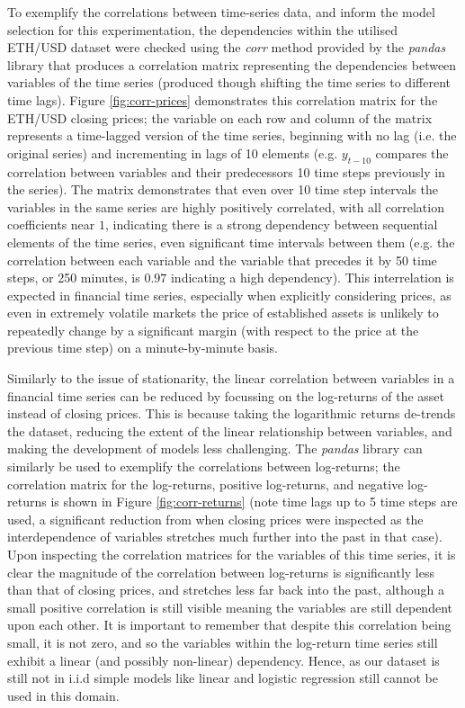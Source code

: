 \documentclass[a4paper, 11pt]{article}
\begin{document}
    To exemplify the correlations between time-series data, and inform the model selection for this experimentation, the dependencies within the utilised ETH/USD dataset were checked using the \emph{corr} method provided by the \emph{pandas} library \cite{pandas} that produces a correlation matrix representing the dependencies between variables of the time series (produced though shifting the time series to different time lags). Figure \ref{fig:corr-prices} demonstrates this correlation matrix for the ETH/USD closing prices; the variable on each row and column of the matrix represents a time-lagged version of the time series, beginning with no lag (i.e. the original series) and incrementing in lags of 10 elements (e.g. $y_{t-10}$ compares the correlation between variables and their predecessors 10 time steps previously in the series). The matrix demonstrates that even over 10 time step intervals the variables in the same series are highly positively correlated, with all correlation coefficients near $1$, indicating there is a strong dependency between sequential elements of the time series, even significant time intervals between them (e.g. the correlation between each variable and the variable that precedes it by 50 time steps, or 250 minutes, is $0.97$ indicating a high dependency). This interrelation is expected in financial time series, especially when explicitly considering prices, as even in extremely volatile markets the price of established assets is unlikely to repeatedly change by a significant margin (with respect to the price at the previous time step) on a minute-by-minute basis.

    Similarly to the issue of stationarity, the linear correlation between variables in a financial time series can be reduced by focussing on the log-returns of the asset instead of closing prices. This is because taking the logarithmic returns de-trends the dataset, reducing the extent of the linear relationship between variables, and making the development of models less challenging. The \emph{pandas} library can similarly be used to exemplify the correlations between log-returns; the correlation matrix for the log-returns, positive log-returns, and negative log-returns is shown in Figure \ref{fig:corr-returns} (note time lags up to 5 time steps are used, a significant reduction from when closing prices were inspected as the interdependence of variables stretches much further into the past in that case). Upon inspecting the correlation matrices for the variables of this time series, it is clear the magnitude of the correlation between log-returns is significantly less than that of closing prices, and stretches less far back into the past, although a small positive correlation is still visible meaning the variables are still dependent upon each other. It is important to remember that despite this correlation being small, it is not zero, and so the variables within the log-return time series still exhibit a linear (and possibly non-linear) dependency. Hence, as our dataset is still not in i.i.d simple models like linear and logistic regression still cannot be used in this domain.
\end{document}
